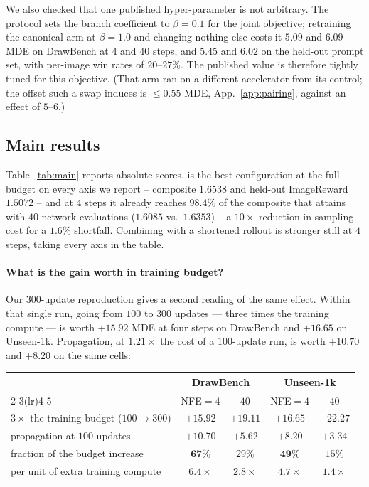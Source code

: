 We also checked that one published hyper-parameter is not arbitrary. The protocol sets the
branch coefficient to $\beta=0.1$ for the joint objective; retraining the canonical arm at
$\beta=1.0$ and changing nothing else costs it $5.09$ and $6.09$ MDE on DrawBench at $4$ and
$40$ steps, and $5.45$ and $6.02$ on the held-out prompt set, with per-image win rates of
$20$--$27\%$. The published value is therefore tightly tuned for this objective. (That arm
ran on a different accelerator from its control; the offset such a swap induces is
$\le0.55$ MDE, App.~\ref{app:pairing}, against an effect of $5$--$6$.)



\subsection{Main results}
\label{sec:exp:main}



Table~\ref{tab:main} reports absolute scores. \MSP is the best configuration at the full
budget on every axis we report -- composite $1.6538$ and held-out ImageReward $1.5072$ --
and at $4$ steps it already reaches $98.4\%$ of the composite that \opsd attains with
$40$ network evaluations ($1.6085$ vs.\ $1.6353$) -- a $10\times$ reduction in sampling
cost for a $1.6\%$ shortfall. Combining \MSP with a shortened rollout is stronger still at
$4$ steps, taking every axis in the table.

\paragraph{What is the gain worth in training budget?} Our $300$-update reproduction gives
a second reading of the same effect. Within that single run, going from $100$ to $300$
updates --- three times the training compute --- is worth $+15.92$ MDE at four steps on
DrawBench and $+16.65$ on Unseen-1k. Propagation, at $1.21\times$ the cost of a $100$-update
run, is worth $+10.70$ and $+8.20$ on the same cells:

\begin{center}
\begin{tabular}{lcccc}
\toprule
& \multicolumn{2}{c}{DrawBench} & \multicolumn{2}{c}{Unseen-1k}\\
\cmidrule(lr){2-3}\cmidrule(lr){4-5}
& NFE$=4$ & $40$ & NFE$=4$ & $40$\\
\midrule
$3\times$ the training budget ($100\!\to\!300$) & $+15.92$ & $+19.11$ & $+16.65$ & $+22.27$\\
propagation at $100$ updates & $+10.70$ & $+5.62$ & $+8.20$ & $+3.34$\\
\midrule
fraction of the budget increase & $\mathbf{67\%}$ & $29\%$ & $\mathbf{49\%}$ & $15\%$\\
per unit of extra training compute & $\mathbf{6.4\times}$ & $2.8\times$ & $\mathbf{4.7\times}$ & $1.4\times$\\
\bottomrule
\end{tabular}
\end{center}

